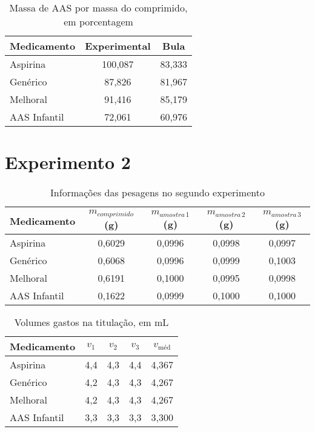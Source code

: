 \begin{table}[H]\label{porcentagem1}
    \centering
    \begin{tabular}{l c c}
        \toprule
        Medicamento & Experimental & Bula \\
        \midrule
        Aspirina\R     & 100,087 & 83,333 \\
        Genérico     & 87,826  & 81,967 \\
        Melhoral\R     & 91,416  & 85,179 \\
        AAS Infantil & 72,061  & 60,976 \\
        \bottomrule
    \end{tabular}
    \caption{Massa de AAS por massa do comprimido, em porcentagem}
\end{table}

\section{Experimento 2}\label{res_exp2}

\begin{table}[H]\label{t:peso_2}
    \centering
    \begin{tabular}{l c c c c}
       \toprule
       Medicamento & $m_{comprimido}$ (g) &$m_{amostra \, 1}$ (g) &
       $m_{amostra \, 2}$ (g) & $m_{amostra\, 3}$ (g)\\
       \midrule
       Aspirina\R     & 0,6029 & 0,0996 & 0,0998 & 0,0997  \\
       Genérico     & 0,6068 & 0,0996 & 0,0999 & 0,1003  \\
       Melhoral\R     & 0,6191 & 0,1000 & 0,0995 & 0,0998 \\
       AAS Infantil & 0,1622 & 0,0999 & 0,1000 & 0,1000 \\
        \bottomrule
    \end{tabular}
    \caption{Informações das pesagens no segundo experimento}
\end{table}

\begin{table}[H]\label{titulacao_exp2}
    \centering
    \begin{tabular}{l c c c c}

        \toprule
        Medicamento & $v_1$  & $v_2$ & $v_3$ &  $v_{\textrm{méd}}$ \\
        \midrule
        Aspirina\R   & 4,4 & 4,3 & 4,4 & 4,367 \\
        Genérico     & 4,2 & 4,3 & 4,3 & 4,267 \\
        Melhoral\R     & 4,2 & 4,3 & 4,3 & 4,267 \\
        AAS Infantil & 3,3 & 3,3 & 3,3 & 3,300 \\
       \bottomrule

    \end{tabular}
    \caption{Volumes gastos na titulação, em mL}
\end{table}

